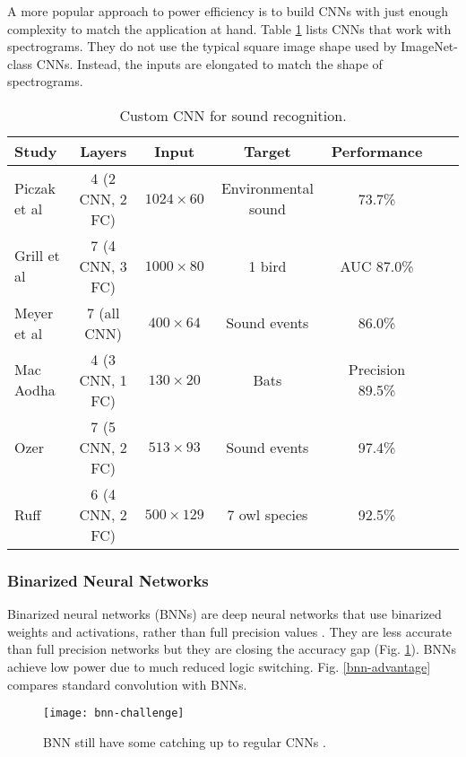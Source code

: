 A more popular approach to power efficiency is to build CNNs with just enough complexity to match the application at hand. Table \ref{customcnn} lists CNNs that work with spectrograms. They do not use the typical square image shape used by ImageNet-class CNNs. Instead, the inputs are elongated to match the shape of spectrograms.



\begin{table}[H]
\renewcommand{\arraystretch}{1}
\small
\centering
\caption{Custom CNN for sound recognition.}
\label{customcnn}
\begin{tabular}{lcccccc}
\toprule
\textbf{Study} & \textbf{Layers} & \textbf{Input} & \textbf{Target} & \textbf{Performance} \\
\midrule
Piczak et al \cite{Piczak2015} & 4 (2 CNN, 2 FC) & $1024\times 60$ & Environmental sound & 73.7\% \\
Grill et al \cite{Grill2017} & 7 (4 CNN, 3 FC) & $1000\times 80$ & 1 bird & AUC 87.0\% \\
Meyer et al \cite{Meyer2017} & 7 (all CNN) & $400\times 64$ & Sound events & 86.0\% \\
Mac Aodha \cite{MacAodha2018} & 4 (3 CNN, 1 FC) & $130\times 20$  & Bats & Precision 89.5\% \\
Ozer \cite{Ozer2018} & 7 (5 CNN, 2 FC) & $513\times 93$ & Sound events & 97.4\% \\
Ruff \cite{Ruff2019} & 6 (4 CNN, 2 FC) & $500\times 129$ & 7 owl species & 92.5\% \\
\bottomrule
\end{tabular}
\end{table}


\subsubsection{Binarized Neural Networks}

Binarized neural networks (BNNs) are deep neural networks that use binarized weights and activations, rather than full precision values \cite{Courbariaux2015}.
They are less accurate than full precision networks but they are closing the accuracy gap (Fig. \ref{bnn-challenge}).
BNNs achieve low power due to much reduced logic switching.
Fig. \ref{bnn-advantage} compares standard convolution with BNNs.


\begin{figure}[H]
    \centering
    \texttt{[image: bnn-challenge]}
    \caption{BNN still have some catching up to regular CNNs \citep{Rastegari2016}.}
    \label{bnn-challenge}
\end{figure}



